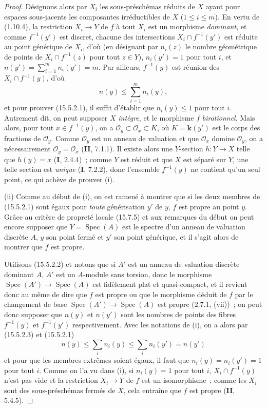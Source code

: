 \begin{proof}
Désignons alors par $X_i$ les sous-préschémas réduits de $X$ ayant pour espaces sous-jacents les composantes irréductibles de $X$ ($1\leqslant i\leqslant m$). En vertu de (1.10.4), la restriction $X_i\to Y$ de $f$ à tout $X_i$ est un morphisme \emph{dominant}, et comme $f^{-1}(y')$ est discret, chacune des intersections $X_i\cap f^{-1}(y')$ est réduite au point générique de $X_i$, d'où (en désignant par $n_i(z)$ le nombre géométrique de points de $X_i\cap f^{-1}(z)$ pour tout $z\in Y$), $n_i(y')=1$ pour tout $i$, et $n(y')=\sum_{i=1}^{m}n_i(y')=m$. Par ailleurs, $f^{-1}(y)$ est réunion des $X_i\cap f^{-1}(y)$, d'où
\begin{equation}
\tag{15.5.2.3}
\label{IV.15.5.2.3-fr}
  n(y)\leqslant\sum_{i=1}^{m}n_i(y),
\end{equation}
et pour prouver (15.5.2.1), il suffit d'établir que $n_i(y)\leqslant 1$ pour tout $i$. Autrement dit, on peut supposer $X$ \emph{intègre}, et le morphisme $f$ \emph{birationnel}. Mais alors, pour tout $x\in f^{-1}(y)$, on a $\mathcal O_y\subset\mathcal O_x\subset K$, où $K=\boldsymbol{k}(y')$ est le corps des fractions de $\mathcal O_y$. Comme $\mathcal O_y$ est un anneau de valuation et que $\mathcal O_x$ domine $\mathcal O_y$, on a nécessairement $\mathcal O_y=\mathcal O_x$ (\textbf{II}, 7.1.1). Il existe alors une $Y$-section $h:Y\to X$ telle que $h(y)=x$ (\textbf{I}, 2.4.4)~; comme $Y$ est réduit et que $X$ est séparé sur $Y$, une telle section est \emph{unique} (\textbf{I}, 7.2.2), donc l'ensemble $f^{-1}(y)$ ne contient qu'un seul point, ce qui achève de prouver (i).

(ii) Comme au début de (i), on est ramené à montrer que si les deux membres de (15.5.2.1) sont égaux pour \emph{toute} générisation $y'$ de $y$, $f$ est propre au point $y$. Grâce au critère de propreté locale (15.7.5) et aux remarques du début on peut encore supposer que $Y=\operatorname{Spec}(A)$ est le spectre d'un anneau de valuation discrète $A$, $y$ son point fermé et $y'$ son point générique, et il s'agit alors de montrer que $f$ est propre.

Utilisons (15.5.2.2) et notons que si $A'$ est un anneau de valuation discrète dominant $A$, $A'$ est un $A$-module sans torsion, donc le morphisme $\operatorname{Spec}(A')\to\operatorname{Spec}(A)$ est fidèlement plat et quasi-compact, et il revient donc au même de dire que $f$ est propre ou que le morphisme déduit de $f$ par le changement de base $\operatorname{Spec}(A')\to\operatorname{Spec}(A)$ est
propre (2.7.1, (vii))~; on peut donc supposer que $n(y)$ et $n(y')$ sont les nombres de points des fibres $f^{-1}(y)$ et $f^{-1}(y')$ respectivement. Avec les notations de (i), on a alors par (15.5.2.3) et (15.5.2.1)
\begin{equation}
\tag{15.5.2.4}
\label{IV.15.5.2.4-fr}
  n(y)\leqslant\sum_i n_i(y)\leqslant\sum_i n_i(y')=n(y')
\end{equation}
et pour que les membres extrêmes soient égaux, il faut que $n_i(y)=n_i(y')=1$ pour tout $i$. Comme on l'a vu dans (i), si $n_i(y)=1$ pour tout $i$, $X_i\cap f^{-1}(y)$ n'est pas vide et la restriction $X_i\to Y$ de $f$ est un isomorphisme~; comme les $X_i$ sont des sous-préschémas fermés de $X$, cela entraîne que $f$ est propre (\textbf{II}, 5.4.5).


\end{proof}
